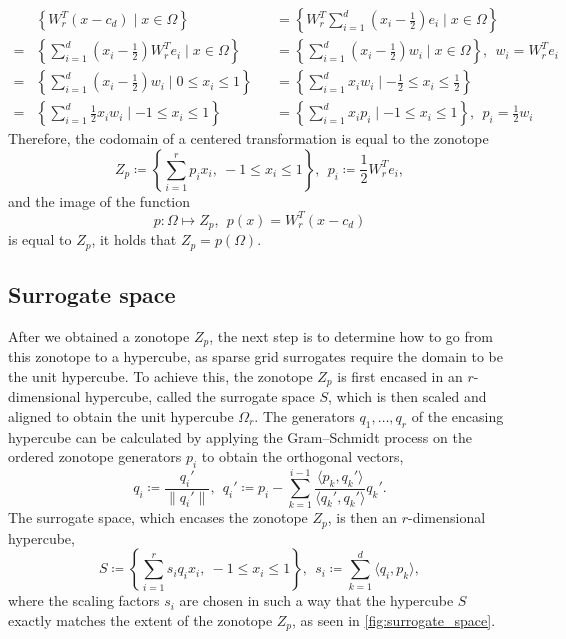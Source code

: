 \documentclass[
  a4paper,  %
  twoside,  %
  bibliography=totoc,
  headsepline,
  cleardoublepage=empty,
  parskip=half,
  draft=false
]{scrbook}
\begin{document}
\begin{equation}
\begin{alignedat}{2}
&\left\{W_r^T (x - c_d) \mid x \in \Omega\right\}&&=\left\{W_r^T \sum_{i=1}^d \left(x_i - \frac{1}{2}\right) e_i \mid x \in \Omega \right\}\\
=&\left\{\sum_{i=1}^d \left(x_i - \frac{1}{2}\right) W_r^T e_i \mid x \in \Omega \right\}&&=\left\{\sum_{i=1}^d \left(x_i - \frac{1}{2}\right) w_i \mid x \in \Omega \right\}, ~~ w_i=W_r^T e_i\\
=&\left\{\sum_{i=1}^d \left(x_i - \frac{1}{2}\right) w_i \mid 0 \leq x_i \leq 1 \right\}&&=\left\{\sum_{i=1}^d x_i w_i \mid -\frac{1}{2} \leq x_i \leq \frac{1}{2} \right\}\\
=&\left\{\sum_{i=1}^d \frac{1}{2} x_i w_i \mid -1 \leq x_i \leq 1 \right\}&&=\left\{\sum_{i=1}^d x_i p_i \mid -1 \leq x_i \leq 1 \right\}, ~~ p_i=\frac{1}{2} w_i
\label{zonotope_form}
\end{alignedat}
\end{equation}
%
Therefore, the codomain of a centered transformation is equal to the zonotope
\begin{equation}
Z_{p} \coloneqq \left\{\sum_{i=1}^r p_i x_i , ~ -1 \leq x_i \leq 1\right\}, ~~ p_i \coloneqq \frac{1}{2} W_r^T e_i,
\end{equation}
and the image of the function
\begin{equation}
p \colon \Omega \mapsto Z_p, ~~ p(x)=W_r^T (x-c_d)
\end{equation}
is equal to $Z_p$, \ie it holds that $Z_{p}=p(\Omega)$.

\subsection{Surrogate space}

After we obtained a zonotope $Z_p$, the next step is to determine how to go from this zonotope to a hypercube, as sparse grid surrogates require the domain to be the unit hypercube.
To achieve this, the zonotope $Z_p$ is first encased in an $r$-dimensional hypercube, called the surrogate space $S$, which is then scaled and aligned to obtain the unit hypercube $\Omega_r$.
The generators $q_1, \dots, q_r$ of the encasing hypercube can be calculated by applying the Gram–Schmidt process on the ordered zonotope generators $p_i$ to obtain the orthogonal vectors,
\begin{equation}
q_i \coloneqq \frac{q_i'}{\| q_i' \|},~~ q_i' \coloneqq p_i - \sum_{k=1}^{i-1} \frac{\langle p_k, q_k'\rangle}{\langle q_k', q_k' \rangle} q_k'.
\label{q}
\end{equation}
%
The surrogate space, which encases the zonotope $Z_p$, is then an $r$-dimensional hypercube,
\begin{equation}
S \coloneqq \left\{\sum_{i=1}^r s_i q_i x_i, ~ -1 \leq x_i \leq 1\right\},~~ s_i \coloneqq \sum_{k=1}^d \langle q_i, p_k\rangle,
\label{surrogate_space}
\end{equation}
where the scaling factors $s_i$ are chosen in such a way that the hypercube $S$ exactly matches the extent of the zonotope $Z_p$, as seen in \cref{fig:surrogate_space}.
\end{document}
